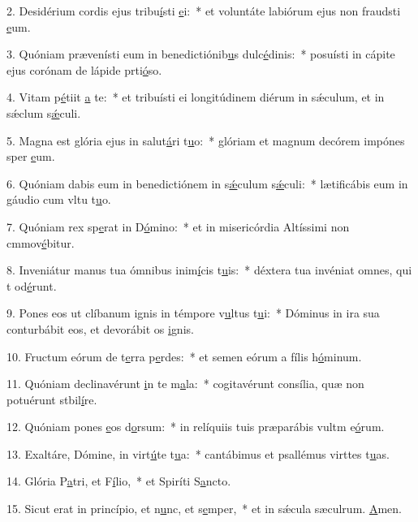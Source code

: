 2. Desidérium cordis ejus tribu\uline{í}sti \uline{e}i:~* et voluntáte labiórum ejus non fraudsti \uline{e}um.\par 
3. Quóniam prævenísti eum in benedictiónib\uline{u}s dulc\uline{é}dinis:~* posuísti in cápite ejus corónam de lápide prti\uline{ó}so.\par 
4. Vitam p\uline{é}tiit \uline{a} te:~* et tribuísti ei longitúdinem diérum in sǽculum, et in sǽclum s\uline{ǽ}culi.\par 
5. Magna est glória ejus in salut\uline{á}ri t\uline{u}o:~* glóriam et magnum decórem impónes sper \uline{e}um.\par 
6. Quóniam dabis eum in benedictiónem in s\uline{ǽ}culum s\uline{ǽ}culi:~* lætificábis eum in gáudio cum vltu t\uline{u}o.\par 
7. Quóniam rex sp\uline{e}rat in D\uline{ó}mino:~* et in misericórdia Altíssimi non cmmov\uline{é}bitur.\par 
8. Inveniátur manus tua ómnibus inim\uline{í}cis t\uline{u}is:~* déxtera tua invéniat omnes, qui t od\uline{é}runt.\par 
9. Pones eos ut clíbanum ignis in témpore v\uline{u}ltus t\uline{u}i:~* Dóminus in ira sua conturbábit eos, et devorábit os \uline{i}gnis.\par 
10. Fructum eórum de t\uline{e}rra p\uline{e}rdes:~* et semen eórum a fílis h\uline{ó}minum.\par 
11. Quóniam declinavérunt \uline{i}n te m\uline{a}la:~* cogitavérunt consília, quæ non potuérunt stbil\uline{í}re.\par 
12. Quóniam pones \uline{e}os d\uline{o}rsum:~* in relíquiis tuis præparábis vultm e\uline{ó}rum.\par 
13. Exaltáre, Dómine, in virt\uline{ú}te t\uline{u}a:~* cantábimus et psallémus virttes t\uline{u}as.\par 
14. Glória P\uline{a}tri, et F\uline{í}lio,~* et Spiríti S\uline{a}ncto.\par 
15. Sicut erat in princípio, et n\uline{u}nc, et s\uline{e}mper,~* et in sǽcula sæculrum. \uline{A}men.\par 
